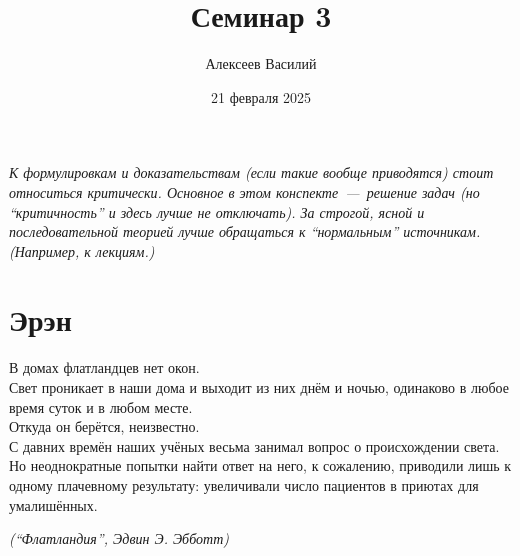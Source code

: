 \documentclass[a4paper,12pt]{article}
\author{Алексеев Василий}
\title{Семинар 3}
\date{21 февраля 2025}
\begin{document}
  \maketitle
  
  \tableofcontents

  \thispagestyle{empty}
  
  \newpage
  
  
  
  \vspace*{\fill}
  
  \noindent
  \emph{
    К формулировкам и доказательствам (если такие вообще приводятся) стоит относиться критически.
    Основное в этом конспекте~---~решение задач (но ``критичность'' и здесь лучше не отключать).
    За строгой, ясной и последовательной теорией лучше обращаться к ``нормальным'' источникам.
    (Например, к лекциям.)
  }
  
  \vspace*{\fill}
  
  \thispagestyle{empty}
  
  \newpage
  
  

  \section{Эрэн}


  \epigraph{
    В домах флатландцев нет окон.\\
    Свет проникает в наши дома и выходит из них днём и ночью, одинаково в любое время суток и в любом месте.\\
    Откуда он берётся, неизвестно.\\
    С давних времён наших учёных весьма занимал вопрос о происхождении света.\\
    Но неоднократные попытки найти ответ на него, к сожалению, приводили лишь к одному плачевному результату: увеличивали число пациентов в приютах для умалишённых.
  }{
    \emph{(``Флатландия'', Эдвин Э. Эбботт)}
  }
\end{document}
